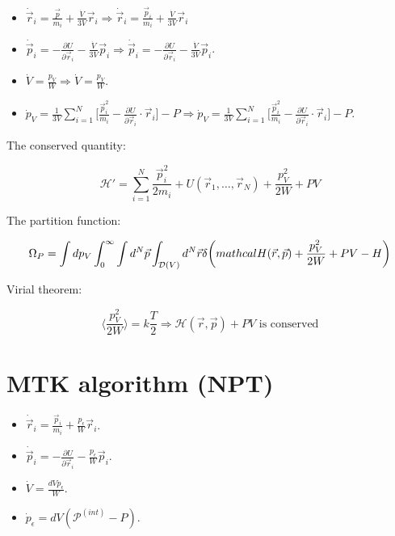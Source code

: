 	\begin{multicols}{2}
		\begin{itemize}
			\item $\dot{\vec{r}}_i = \frac{\vec{p}}{m_i} + \frac{\dot{V}}{3V}\vec{r}_i\Rightarrow\dot{\vec{r}}_i = \frac{\vec{p}_i}{m_i} + \frac{\dot{V}}{3V}\vec{r}_i$
			\item $\dot{\vec{p}}_i = -\frac{\partial U}{\partial\vec{r}_i} -\frac{\dot{V}}{3V}\vec{p}_i\Rightarrow \dot{\vec{p}}_i = -\frac{\partial U}{\partial\vec{r}_i}-\frac{\dot{V}}{3V}\vec{p}_i$.
			\item $\dot{V} = \frac{p_V}{W}\Rightarrow\dot{V} = \frac{p_V}{W}$.
			\item $\dot{p}_V = \frac{1}{3V}\sum\limits_{i=1}^N\biggl[\frac{\vec{p}_i^2}{m_i}-\frac{\partial U}{\partial\vec{r}_i}\cdot\vec{r}_i\biggr]-P\Rightarrow\dot{p}_V = \frac{1}{3V}\sum\limits_{i=1}^N\biggl[\frac{\vec{p}_i^2}{m_i}-\frac{\partial U}{\partial\vec{r}_i}\cdot\vec{r}_i\biggr]-P$.
		\end{itemize}
	\end{multicols}

	The conserved quantity:

	$$\mathcal{H}' = \sum\limits_{i=1}^N\frac{\vec{p}_i^2}{2m_i} + U(\vec{r}_1, \dots, \vec{r}_N) + \frac{p_V^2}{2W}+PV$$

	The partition function:

	$$\Omega_P = \int dp_V\int_0^{\infty}\int d^N\vec{p}\int_{\mathcal{D}(V)}d^N\vec{r}\delta\biggl(\\mathcal{H}(\vec{r},\vec{p}) + \frac{p_V^2}{2W}+PV-H\biggr)$$

	Virial theorem:

	$$\biggl\langle\frac{p_V^2}{2W}\biggr\rangle = k\frac{T}{2}\Rightarrow \mathcal{H}(\vec{r},\vec{p}) + PV\text{ is conserved}$$

\section{MTK algorithm (NPT)}

\begin{multicols}{2}
	\begin{itemize}
		\item $\dot{\vec{r}}_i = \frac{\vec{p}_i}{m_i} + \frac{p_\epsilon}{W}\vec{r}_i$.
		\item $\dot{\vec{p}}_i = -\frac{\partial U}{\partial\vec{r}_i} - \frac{p_\epsilon}{W}\vec{p}_i$.
		\item $\dot{V} = \frac{dVp_\epsilon}{W}$.
		\item $\dot{p}_\epsilon = dV(\mathcal{P}^{(int)}-P)$.
	\end{itemize}
\end{multicols}

